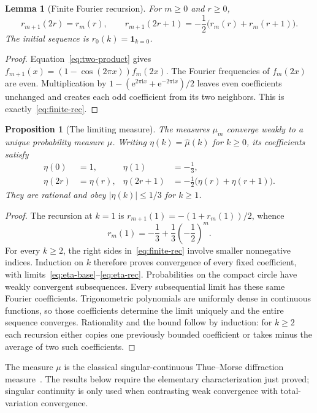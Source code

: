\documentclass[11pt,a4paper]{article}
\numberwithin{equation}{section}
\newtheorem{lemma}[theorem]{Lemma}
\newtheorem{proposition}[theorem]{Proposition}
\theoremstyle{definition}
\theoremstyle{remark}
\newcommand{\ee}{\mathrm e}
\newcommand{\ii}{\mathrm i}
\begin{document}
\begin{lemma}[Finite Fourier recursion]
\label{lem:finite-rec}
For $m\ge0$ and $r\ge0$,
\begin{equation}
 r_{m+1}(2r)=r_m(r),\qquad
 r_{m+1}(2r+1)=-\frac12\bigl(r_m(r)+r_m(r+1)\bigr).
 \label{eq:finite-rec}
\end{equation}
The initial sequence is $r_0(k)=\mathbf1_{k=0}$.
\end{lemma}
\begin{proof}
Equation~\eqref{eq:two-product} gives
$f_{m+1}(x)=(1-\cos(2\pi x))f_m(2x)$. The Fourier frequencies of $f_m(2x)$
are even. Multiplication by $1-(\ee^{2\pi\ii x}+\ee^{-2\pi\ii x})/2$ leaves
even coefficients unchanged and creates each odd coefficient from its two
neighbors. This is exactly~\eqref{eq:finite-rec}.
\end{proof}

\begin{proposition}[The limiting measure]
\label{prop:limit}
The measures $\mu_m$ converge weakly to a unique probability measure $\mu$.
Writing $\eta(k)=\widehat\mu(k)$ for $k\ge0$, its coefficients satisfy
\begin{align}
 \eta(0)&=1,&\eta(1)&=-\frac13,\label{eq:eta-base}\\
 \eta(2r)&=\eta(r),&
 \eta(2r+1)&=-\frac12\bigl(\eta(r)+\eta(r+1)\bigr).
 \label{eq:eta-rec}
\end{align}
They are rational and obey $|\eta(k)|\le1/3$ for $k\ge1$.
\end{proposition}
\begin{proof}
The recursion at $k=1$ is
$r_{m+1}(1)=-(1+r_m(1))/2$, whence
\begin{equation}
 r_m(1)=-\frac13+\frac13\left(-\frac12\right)^m.
 \label{eq:mode-one}
\end{equation}
For every $k\ge2$, the right sides in~\eqref{eq:finite-rec} involve smaller
nonnegative indices. Induction on $k$ therefore proves convergence of every fixed
coefficient, with limits~\eqref{eq:eta-base}--\eqref{eq:eta-rec}. Probabilities
on the compact circle have weakly convergent subsequences. Every subsequential
limit has these same Fourier coefficients. Trigonometric polynomials are uniformly
dense in continuous functions, so those coefficients determine the limit uniquely
and the entire sequence converges. Rationality and the bound follow by induction:
for $k\ge2$ each recursion either copies one previously bounded coefficient or
takes minus the average of two such coefficients.
\end{proof}
The measure $\mu$ is the classical singular-continuous Thue--Morse diffraction
measure~\cite{BG}. The results below require the elementary characterization
just proved; singular continuity is only used when contrasting weak convergence
with total-variation convergence.
\end{document}
